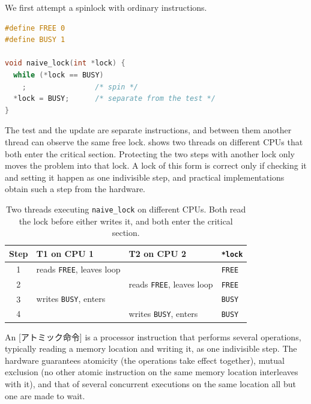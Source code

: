 \documentclass[../main.tex]{subfiles}
\begin{document}
We first attempt a spinlock with ordinary instructions.
\begin{lstlisting}[language=C, numbers=none]
#define FREE 0
#define BUSY 1

void naive_lock(int *lock) {
  while (*lock == BUSY)
    ;                /* spin */
  *lock = BUSY;      /* separate from the test */
}
\end{lstlisting}
The test and the update are separate instructions, and between them
another thread can observe the same free lock.  
shows two threads on different CPUs that both enter the critical section.
Protecting the two steps with another lock only moves the problem into that
lock.  A lock of this form is correct only if checking it and setting it
happen as one indivisible step, and practical implementations obtain such a
step from the hardware.

\begin{table}[htbp]
  \centering
  \caption{Two threads executing \texttt{naive\_lock} on different CPUs.
    Both read the lock before either writes it, and both enter the
    critical section.}
  \label{tab:l10-naive-race}
  \small
  \begin{tabular}{@{}clll@{}}
    \toprule
    Step & T1 on CPU 1 & T2 on CPU 2 & \texttt{*lock} \\
    \midrule
    1 & reads \texttt{FREE}, leaves loop &                          & \texttt{FREE} \\
    2 &                         & reads \texttt{FREE}, leaves loop  & \texttt{FREE} \\
    3 & writes \texttt{BUSY}, enters    &                          & \texttt{BUSY} \\
    4 &                         & writes \texttt{BUSY}, enters      & \texttt{BUSY} \\
    \bottomrule
  \end{tabular}
\end{table}

\begin{definition}
  An [アトミック命令] is a processor instruction
  that performs several operations, typically reading a memory location and
  writing it, as one indivisible step.  The hardware guarantees atomicity
  (the operations take effect together), mutual exclusion (no other atomic
  instruction on the same memory location interleaves with it), and that of
  several concurrent executions on the same location all but one are made
  to wait.
\end{definition}
\end{document}
